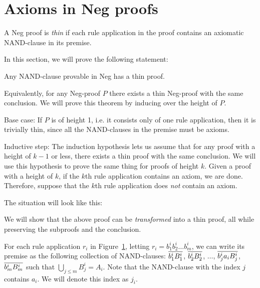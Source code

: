 \section{Axioms in Neg proofs}
\label{sec:Axioms in Neg proofs}
\begin{definition}
  A Neg proof is \textit{thin} if each rule application in the proof contains an axiomatic NAND-clause in its premise.
\end{definition}
In this section, we will prove the following statement:
\begin{theorem}
  Any NAND-clause provable in Neg has a thin proof.
\end{theorem}
Equivalently, for any Neg-proof $P$ there exists a thin Neg-proof with the same conclusion.
We will prove this theorem by inducing over the height of $P$.

Base case: If $P$ is of height 1, i.e. it consists only of one rule application, then it is trivially thin, since all the NAND-clauses in the premise must be axioms.

Inductive step: The induction hypothesis lets us assume that for any proof with a height of $k-1$ or less, there exists a thin proof with the same conclusion.
We will use this hypothesis to prove the same thing for proofs of height $k$.
Given a proof with a height of $k$, if the $k$th rule application contains an axiom, we are done.
Therefore, suppose that the $k$th rule application does \textit{not} contain an axiom.

The situation will look like this:\par
\begin{figure}[!h]
  \centering
  \begin{prooftree*}
    \Hypo{\dots}
    \Hypo{\dots}
    \Hypo{\dots}
    \Hypo{\dots}
    \Hypo{\dots}
  \end{prooftree*}
  \caption{}
  \label{fig:non_thin_proof}
\end{figure}
We will show that the above proof can be \textit{transformed} into a thin proof, all while preserving the subproofs and the conclusion.

For each rule application $r_i$ in Figure~\ref{fig:non_thin_proof}, letting $r_i = b^i_1b^i_2\dots b^i_m$, we can write its premise as the following collection of NAND-clauses:
$\ol{b^i_1B^i_1}$, $ \ol{b^i_2B^i_2}$, $\dots$, $ \ol{b^i_j a_i B^i_j}$, $\ol{b^i_mB^i_m}$ such that $\bigcup_{j \leq m} B^i_j = A_i$.
Note that the NAND-clause with the index $j$ contains $a_i$.
We will denote this index as $j_i$.

